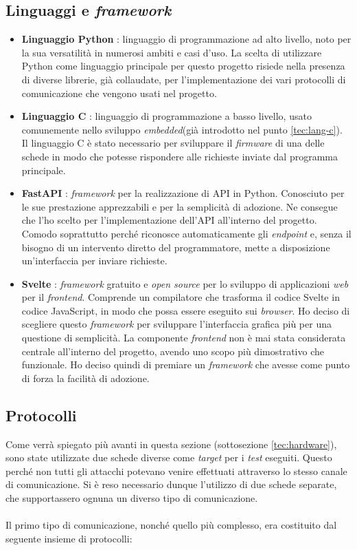 \subsection{Linguaggi e \textit{framework}}
\begin{itemize}
	\itemsep0em
	\item \textbf{Linguaggio Python} : linguaggio di programmazione ad alto livello, noto per la sua versatilità in numerosi ambiti e casi d'uso.
	La scelta di utilizzare Python come linguaggio principale per questo progetto risiede nella presenza di diverse librerie, già collaudate, per l'implementazione dei vari protocolli di comunicazione che vengono usati nel progetto.
	\item \textbf{Linguaggio C} : linguaggio di programmazione a basso livello, usato comunemente nello sviluppo \textit{embedded}(già introdotto nel punto \ref{tec:lang-c}).
	Il linguaggio C è stato necessario per sviluppare il \textit{firmware} di una delle schede in modo che potesse rispondere alle richieste inviate dal programma principale.
	\item \textbf{FastAPI} : \textit{framework} per la realizzazione di API in Python.
	Conosciuto per le sue prestazione apprezzabili e per la semplicità di adozione.
	Ne consegue che l'ho scelto per l'implementazione dell'API all'interno del progetto.
	Comodo soprattutto perché riconosce automaticamente gli \textit{endpoint} e, senza il bisogno di un intervento diretto del programmatore, mette a disposizione un'interfaccia per inviare richieste.
	\item \textbf{Svelte} : \textit{framework} gratuito e \textit{open source} per lo sviluppo di applicazioni \textit{web} per il \textit{frontend}.
	Comprende un compilatore che trasforma il codice Svelte in codice JavaScript, in modo che possa essere eseguito sui \textit{browser}.
	Ho deciso di scegliere questo \textit{framework} per sviluppare l'interfaccia grafica più per una questione di semplicità.
	La componente \textit{frontend} non è mai stata considerata centrale all'interno del progetto, avendo uno scopo più dimostrativo che funzionale.
	Ho deciso quindi di premiare un \textit{framework} che avesse come punto di forza la facilità di adozione.
\end{itemize}

\subsection{Protocolli}
\noindent
Come verrà spiegato più avanti in questa sezione (sottosezione \ref{tec:hardware}), sono state utilizzate due schede diverse come \textit{target} per i \textit{test} eseguiti.
Questo perché non tutti gli attacchi potevano venire effettuati attraverso lo stesso canale di comunicazione.
Si è reso necessario dunque l'utilizzo di due schede separate, che supportassero ognuna un diverso tipo di comunicazione.
\\\\
\noindent
Il primo tipo di comunicazione, nonché quello più complesso, era costituito dal seguente insieme di protocolli:

